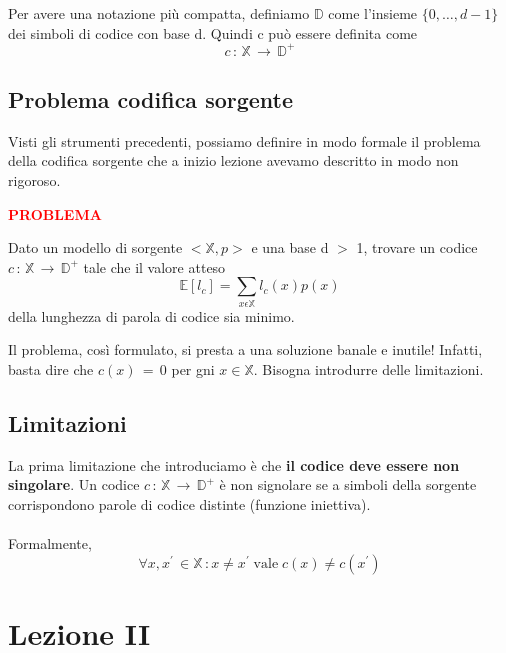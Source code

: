 \documentclass[12pt]{report}
\begin{document}
    \noindent Per avere una notazione più compatta, definiamo $\mathbb{D}$ come l'insieme $\{0,\dots,d-1\}$ dei simboli di codice con base d. Quindi c può essere definita come  $$c\,:\, \mathbb{X} \, \rightarrow \, \mathbb{D}^+$$

    \section{Problema codifica sorgente}

    Visti gli strumenti precedenti, possiamo definire in modo formale il problema della codifica sorgente che a inizio lezione avevamo descritto in modo non rigoroso.

    \vspace{5px}
    \begin{tcolorbox}
        \textbf{\textcolor{red}{PROBLEMA}}
        \vspace{5px}
        \begin{center}
            Dato un modello di sorgente $<\mathbb{X},p>$ e una base d $>$ 1, trovare un codice $c\,:\,\mathbb{X} \, \rightarrow \, \mathbb{D}^+$ tale che il valore atteso $$\mathbb{E}[l_c] = \sum_{x\epsilon\mathbb{X}} l_c(x) p(x)$$ della lunghezza di parola di codice sia minimo.
        \end{center}
    \end{tcolorbox}
    \vspace{5px}

    \noindent Il problema, così formulato, si presta a una soluzione banale e inutile! Infatti, basta dire che $c(x)\,=\,0$ per gni $x \in \mathbb{X}$. Bisogna introdurre delle limitazioni.

    \section{Limitazioni}

    La prima limitazione che introduciamo è che \textbf{il codice deve essere non singolare}. Un codice $c\,:\,\mathbb{X}\,\rightarrow \, \mathbb{D}^+$ è non signolare se a simboli della sorgente corrispondono parole di codice distinte (funzione iniettiva).  \\
    \\
    Formalmente, $$\forall x,x^{'} \, \in \mathbb{X}\,: x\neq x^{'} \; \text{vale} \; c(x) \neq c(x^{'})$$

    \chapter{Lezione II}
    \label{cap:Lezione II}
\end{document}
